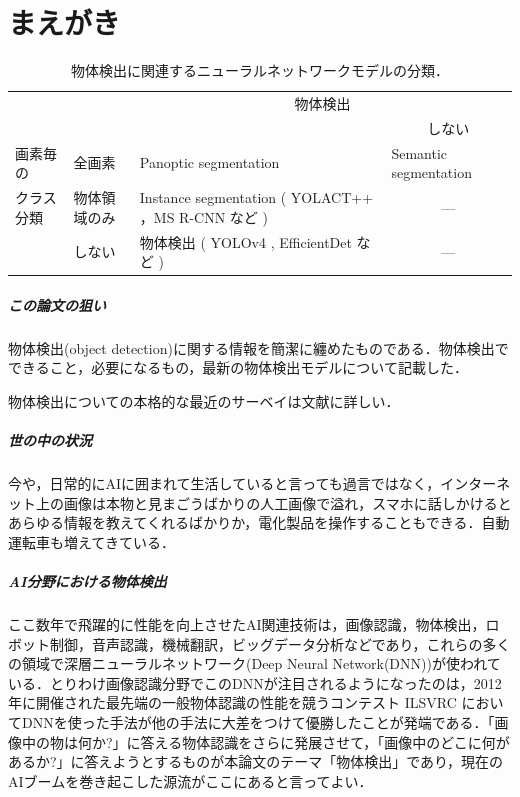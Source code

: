 \documentclass[twocolumn]{jsarticle} %
\begin{document}
\section{まえがき}
\begin{table}
    \caption{物体検出に関連するニューラルネットワークモデルの分類．}
    \label{tbl-select-l}
    \begin{center}
        \setlength{\doublerulesep}{0.5pt}
        \begin{tabularx}{\linewidth}{|p{1.7cm}|p{1.0cm}||X|p{3.6cm}|} \hline
            \multicolumn{2}{|c||}{} & \multicolumn{2}{c|}{物体検出} \\ \cline{3-4}
            \multicolumn{2}{|l||}{} & \centering{する} & \multicolumn{1}{c|}{しない} \\ \hline\hline
            画素毎の & 全画素 & Panoptic segmentation \cite{KHGRD19} & Semantic segmentation \\ \cline{2-4}
            クラス分類 & 物体領域のみ  & Instance segmentation ( YOLACT++ \cite{BZXL20}，MS R-CNN \cite{HHGHW19} など ) &  \multicolumn{1}{c|}{---} \\ \cline{2-4}
            & しない & 物体検出 ( YOLOv4 \cite{BWL20}, EfficientDet \cite{TPL20} など ) & \multicolumn{1}{c|}{---} \\ 
            \hline
        \end{tabularx}
    \end{center}
\end{table}

\subparagraph{この論文の狙い} 物体検出(object detection)に関する情報を簡潔に纏めたものである．物体検出でできること，必要になるもの，最新の物体検出モデルについて記載した．

物体検出についての本格的な最近のサーベイは文献\cite{JZLYLFQ19}に詳しい．

\subparagraph{世の中の状況} 
今や，日常的にAIに囲まれて生活していると言っても過言ではなく，インターネット上の画像は本物と見まごうばかりの人工画像で溢れ，スマホに話しかけるとあらゆる情報を教えてくれるばかりか，電化製品を操作することもできる．自動運転車も増えてきている．

\subparagraph{AI分野における物体検出} ここ数年で飛躍的に性能を向上させたAI関連技術は，画像認識，物体検出，ロボット制御，音声認識，機械翻訳，ビッグデータ分析などであり，これらの多くの領域で深層ニューラルネットワーク(Deep Neural Network(DNN))が使われている．とりわけ画像認識分野でこのDNNが注目されるようになったのは，2012年に開催された最先端の一般物体認識の性能を競うコンテスト ILSVRC においてDNNを使った手法が他の手法に大差をつけて優勝したことが発端である．「画像中の物は何か?」に答える物体認識をさらに発展させて，「画像中のどこに何があるか?」に答えようとするものが本論文のテーマ「物体検出」であり，現在のAIブームを巻き起こした源流がここにあると言ってよい．
\end{document}
